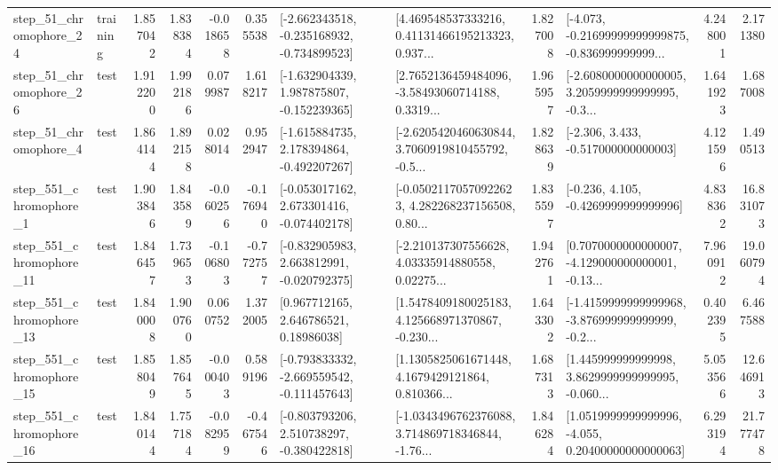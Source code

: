 \begin{tabular}{llrrrrllrlrr}
   step\_51\_chromophore\_24 &  training &      1.857042 &    1.838384 &     -0.018658 &  0.355538 &  [-2.662343518, -0.235168932, -0.734899523] &  [4.469548537333216, 0.41131466195213323, 0.937... &       1.827008 &  [-4.073, -0.21699999999999875, -0.836999999999... &            4.248001 &          2.171380 \\
   step\_51\_chromophore\_26 &      test &      1.912200 &    1.992186 &      0.079987 &  1.618217 &   [-1.632904339, 1.987875807, -0.152239365] &  [2.7652136459484096, -3.58493060714188, 0.3319... &       1.965957 &  [-2.6080000000000005, 3.2059999999999995, -0.3... &            1.641923 &          1.687008 \\
    step\_51\_chromophore\_4 &      test &      1.864144 &    1.892158 &      0.028014 &  0.952947 &   [-1.615884735, 2.178394864, -0.492207267] &  [-2.6205420460630844, 3.7060919810455792, -0.5... &       1.828639 &                [-2.306, 3.433, -0.517000000000003] &            4.121596 &          1.490513 \\
   step\_551\_chromophore\_1 &      test &      1.903846 &    1.843589 &     -0.060256 & -0.176940 &   [-0.053017162, 2.673301416, -0.074402178] &  [-0.05021170570922623, 4.282268237156508, 0.80... &       1.835597 &               [-0.236, 4.105, -0.4269999999999996] &            4.838362 &         16.831073 \\
  step\_551\_chromophore\_11 &      test &      1.846457 &    1.739653 &     -0.106803 & -0.772757 &   [-0.832905983, 2.663812991, -0.020792375] &  [-2.210137307556628, 4.03335914880558, 0.02275... &       1.942761 &  [0.7070000000000007, -4.129000000000001, -0.13... &            7.960912 &         19.060794 \\
  step\_551\_chromophore\_13 &      test &      1.840008 &    1.900760 &      0.060752 &  1.372005 &      [0.967712165, 2.646786521, 0.18986038] &  [1.5478409180025183, 4.125668971370867, -0.230... &       1.643302 &  [-1.4159999999999968, -3.876999999999999, -0.2... &            0.402395 &          6.467588 \\
  step\_551\_chromophore\_15 &      test &      1.858049 &    1.857645 &     -0.000403 &  0.589196 &  [-0.793833332, -2.669559542, -0.111457643] &  [1.1305825061671448, 4.1679429121864, 0.810366... &       1.687313 &  [1.445999999999998, 3.8629999999999995, -0.060... &            5.053566 &         12.646913 \\
  step\_551\_chromophore\_16 &      test &      1.840144 &    1.757184 &     -0.082959 & -0.467546 &   [-0.803793206, 2.510738297, -0.380422818] &  [-1.0343496762376088, 3.714869718346844, -1.76... &       1.846284 &  [1.0519999999999996, -4.055, 0.20400000000000063] &            6.293194 &         21.777478 \\

\end{tabular}
